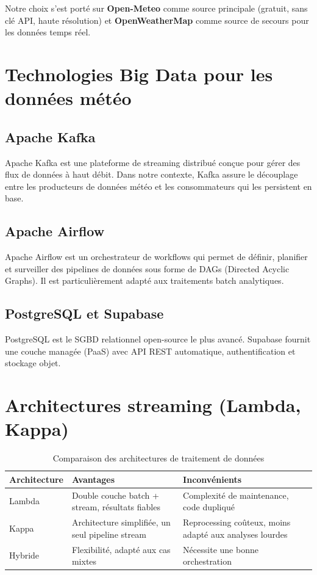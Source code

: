 \documentclass[a4paper,12pt,oneside]{report}
\begin{document}
Notre choix s'est porté sur \textbf{Open-Meteo} comme source principale (gratuit, sans clé API, haute résolution) et \textbf{OpenWeatherMap} comme source de secours pour les données temps réel.

\section{Technologies Big Data pour les données météo}

\subsection{Apache Kafka}
Apache Kafka est une plateforme de streaming distribué conçue pour gérer des flux de données à haut débit. Dans notre contexte, Kafka assure le découplage entre les producteurs de données météo et les consommateurs qui les persistent en base.

\subsection{Apache Airflow}
Apache Airflow est un orchestrateur de workflows qui permet de définir, planifier et surveiller des pipelines de données sous forme de DAGs (Directed Acyclic Graphs). Il est particulièrement adapté aux traitements batch analytiques.

\subsection{PostgreSQL et Supabase}
PostgreSQL est le SGBD relationnel open-source le plus avancé. Supabase fournit une couche managée (PaaS) avec API REST automatique, authentification et stockage objet.

\section{Architectures streaming (Lambda, Kappa)}

\begin{table}[H]
\centering
\caption{Comparaison des architectures de traitement de données}
\label{tab:archi}
\begin{tabularx}{\textwidth}{lXX}
\toprule
\textbf{Architecture} & \textbf{Avantages} & \textbf{Inconvénients} \\
\midrule
Lambda  & Double couche batch + stream, résultats fiables & Complexité de maintenance, code dupliqué \\
Kappa   & Architecture simplifiée, un seul pipeline stream & Reprocessing coûteux, moins adapté aux analyses lourdes \\
Hybride & Flexibilité, adapté aux cas mixtes & Nécessite une bonne orchestration \\
\bottomrule
\end{tabularx}
\end{table}
\end{document}
